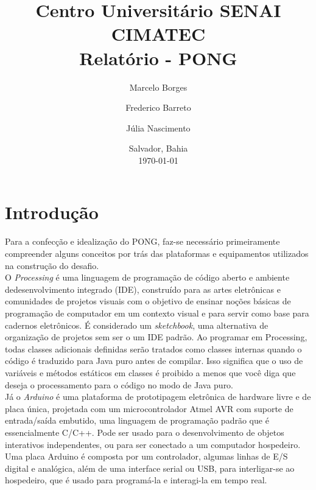\documentclass[11pt, a4paper, twocolumn]{article}
\begin{document}
\title{Centro Universitário SENAI CIMATEC\\
    \vspace{1cm}
    \textbf{Relatório - PONG \\}
}
\author[1]{Marcelo Borges}
\author[2]{Frederico Barreto}
\author[3]{Júlia Nascimento}
\date{Salvador, Bahia\\\today}
\maketitle
\begin{abstract} 
\end{abstract}
\section{Introdução}
    Para a confecção e idealização do PONG, faz-se necessário primeiramente compreender alguns conceitos por 
    trás das plataformas e equipamentos utilizados na construção do desafio.
    \\
    O \textit{Processing} é uma linguagem de programação de código aberto e ambiente dedesenvolvimento integrado 
    (IDE), construído para as artes eletrônicas e comunidades de projetos visuais com o objetivo de 
    ensinar noções básicas de programação de computador em um contexto visual e para servir como base para 
    cadernos eletrônicos. É considerado um \textit{sketchbook}, uma alternativa de organização de 
    projetos sem ser o um IDE padrão. Ao programar em Processing, todas classes adicionais definidas serão
    tratados como classes internas quando o código é traduzido para Java puro antes de
    compilar. Isso significa que o uso de variáveis e métodos estáticos em classes é proibido
    a menos que você diga que deseja o processamento para o código no modo de Java puro.
    \\
    Já o \textit{Arduino} é uma plataforma de prototipagem eletrônica de hardware livre e de placa única,
    projetada com um microcontrolador Atmel AVR com suporte de entrada/saída embutido, uma
    linguagem de programação padrão que é essencialmente C/C++. 
    Pode ser usado para o desenvolvimento de objetos interativos independentes, ou para ser
    conectado a um computador hospedeiro. Uma placa Arduino é composta por um controlador,
    algumas linhas de E/S digital e analógica, além de uma interface serial ou USB, para
    interligar-se ao hospedeiro, que é usado para programá-la e interagi-la em tempo real.
\end{document}

